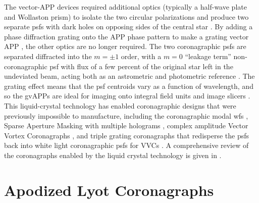 \documentclass[letterpaper]{ar-1col}
\begin{document}
%
The vector-APP devices required additional optics (typically a half-wave plate and Wollaston prism) to isolate the two circular polarizations and produce two separate \acp{psf} with dark holes on opposing sides of the central star \citep{Snik12}.
%
By adding a phase diffraction grating onto the APP phase pattern to make a grating vector APP \citep[gvAPP; ][]{Snik12,Otten14}, the other optics are no longer required.
%
The two coronagraphic \acp{psf} are separated diffracted into the $m=\pm 1$ order, with a $m=0$ ``leakage term'' non-coronagraphic \ac{psf} with flux of a few percent of the original star left in the undeviated beam, acting both as an astrometric and photometric reference \citep{Otten17,Sutlieff24}.
%
The grating effect means that the \ac{psf} centroids vary as a function of wavelength, and so the gvAPPs are ideal for imaging onto integral field units and image slicers \citep{Sutlieff21,Sutlieff23}.
%
This liquid-crystal technology has enabled coronagraphic designs that were previously impossible to manufacture, including the coronagraphic modal \ac{wfs} \citep{Wilby17}, Sparse Aperture Masking with multiple holograms \citep{Doelman21}, complex amplitude Vector Vortex Coronagraphs \citep[VVC; ][]{Snik14}, and triple grating coronagraphs \citep{Doelman20} that redisperse the \acp{psf} back into white light coronagraphic \acp{psf} for VVCs \citep{Doelman23,Laginga24}. 
%
A comprehensive review of the coronagraphs enabled by the liquid crystal technology is given in \citet{Doelman2021a}.

\section{Apodized Lyot Coronagraphs}\label{sec:nulled_lyot}
\end{document}
